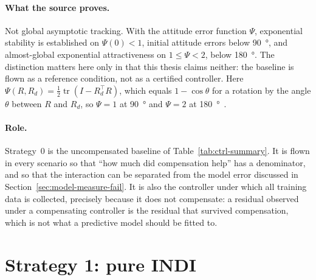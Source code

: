 \paragraph{What the source proves.} Not global asymptotic tracking. With the attitude error
function $\Psi$, exponential stability is established on $\Psi(0) < 1$, initial attitude errors
below \SI{90}{\degree}, and almost-global exponential attractiveness on $1 \le \Psi < 2$,
below \SI{180}{\degree}. The distinction matters here only in that this thesis claims neither: the
baseline is flown as a reference condition, not as a certified controller.
Here $\Psi(R, R_d) = \tfrac{1}{2}\operatorname{tr}(I - R_d^\top R)$, which equals $1 - \cos\theta$
for a rotation by the angle $\theta$ between $R$ and $R_d$, so $\Psi = 1$ at \SI{90}{\degree} and
$\Psi = 2$ at \SI{180}{\degree}~\cite{lee2010geometricse3}.

\paragraph{Role.} Strategy~0 is the uncompensated baseline of Table~\ref{tab:ctrl-summary}. It is
flown in every scenario so that ``how much did compensation help'' has a denominator, and so that
the interaction can be separated from the model error discussed in
Section~\ref{sec:model-measure-fail}. It is also the controller under
which all training data is collected, precisely because it does not compensate: a residual observed
under a compensating controller is the residual that survived compensation, which is not what a
predictive model should be fitted to.

\section{Strategy 1: pure INDI}
\label{sec:ctrl-s1}

